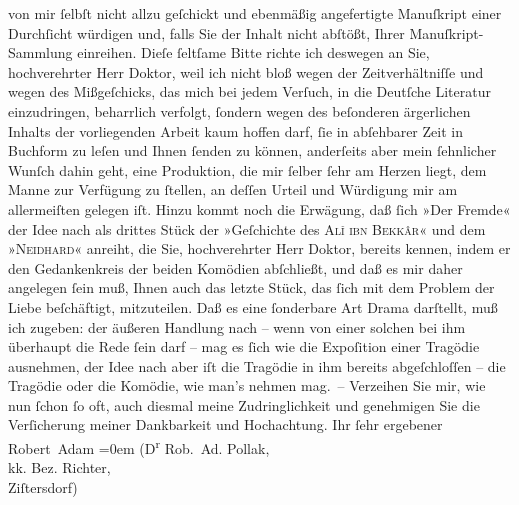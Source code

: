 \begin{ledgroupsized}[t]{13cm}
               von mir ſelbſt nicht allzu geſchickt und ebenmäßig angefertigte Manuſkript einer
               Durchſicht würdigen und, falls Sie der Inhalt nicht abſtößt, Ihrer
               Manuſkript-Sammlung einreihen.\pend
           \pstart
           Dieſe ſeltſame Bitte richte ich deswe{\pb}gen an Sie,
               hochverehrter Herr Doktor, weil ich nicht bloß wegen der Zeitverhältniſſe und wegen
               des Mißgeſchicks, das mich bei jedem Verſuch, in die Deutſche Literatur einzudringen,
               beharrlich verfolgt, ſondern wegen des beſonderen ärgerlichen Inhalts der
               vorliegenden Arbeit kaum hoffen darf, ſie in abſehbarer Zeit in Buchform zu leſen und
               Ihnen ſenden zu können, anderſeits aber mein ſehnlicher Wunſch dahin geht, eine
               Produktion, die mir ſelber ſehr am Herzen liegt, dem Manne zur Verfügung zu ſtellen,
               an deſſen Urteil und Würdigung mir am allermeiſten gelegen iſt.\pend
           \pstart
           Hinzu kommt noch die Erwägung, daß ſich »Der
                  Fremde« der Idee nach als drittes Stück der »Geſchichte des \textsc{Alî ibn Bekkâr}« und dem »\textsc{Neidhard}« anreiht, die Sie, hochverehrter Herr Doktor, bereits kennen, indem er den
               Gedankenkreis der beiden Komödien abſchließt, und daß es mir daher angelegen ſein
               muß, Ihnen auch das letzte Stück, das ſich mit {\pb}dem
               Problem der Liebe beſchäftigt, mitzuteilen. Daß es eine ſonderbare Art Drama
               darſtellt, muß ich zugeben: der äußeren Handlung nach – wenn von einer solchen bei
               ihm überhaupt die Rede ſein darf – mag es ſich wie die Expoſition einer Tragödie
               ausnehmen, der Idee nach aber iſt die Tragödie in ihm bereits abgeſchloſſen – die
               Tragödie oder die Komödie, wie man’s nehmen mag. –\pend
           \pstart
           Verzeihen Sie mir, wie nun ſchon ſo oft, auch diesmal meine Zudringlichkeit und
               genehmigen Sie die Verſicherung meiner Dankbarkeit und Hochachtung.\pend
           \pstart
           Ihr ſehr ergebener{\\[\baselineskip]}\spacefill\mbox{Robert Adam}\pend
           \leftskip=0em{}\pstart
           \noindent{}\raggedleft{}(D\textsuperscript{r} Rob. Ad. Pollak,{\\}kk. Bez. Richter,{\\}Ziſtersdorf)\pend
           
         
         \endnumbering{}\end{ledgroupsized}  \newcommand{\dateiname}{L02207}\newcommand{\titel}{Robert Adam an Arthur Schnitzler, 1. 6. 1915}\newcommand{\editorInnen}{Martin Anton Müller und Gerd-Hermann Susen}
      